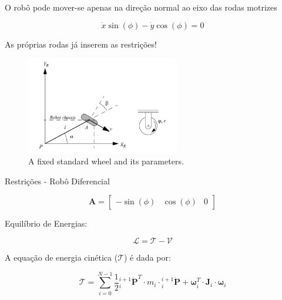  O robô pode mover-se apenas na direção normal ao eixo das rodas motrizes


\begin{equation*}
    \dot{x}\sin(\phi) - \dot{y}\cos(\phi) = 0
\end{equation*}

As próprias rodas já inserem as restrições!


\begin{figure}
    
\end{figure}


\begin{figure}
    \includegraphics[width=0.6\textwidth]{chapters/chapter1/figures/wheels_const.png}    
    \caption{A fixed standard wheel and its parameters.}
\end{figure}










Restrições - Robô Diferencial



\begin{equation}
    \mathbf{A} = 
    \begin{bmatrix}
        -\sin(\phi) & \cos(\phi) & 0
    \end{bmatrix}
\end{equation}


Equilíbrio de Energias:

\begin{equation}
    \mathcal{L}= \mathcal{T} - \mathcal{V}
\end{equation}

A equação de energia cinética ($\mathcal{T}$) é dada por:

\begin{equation}
    \mathcal{T} = \sum\limits_{i=0}^{N-1} \frac{1}{2} {}_{i}^{i+1}\dot{\mathbf{P}}^T\cdot m_{i}\cdot {}_{i}^{i+1}\dot{\mathbf{P}}+ \mathbf{\omega}_i^T\cdot \mathbf{J}_i \cdot \mathbf{\omega}_i
\end{equation}

